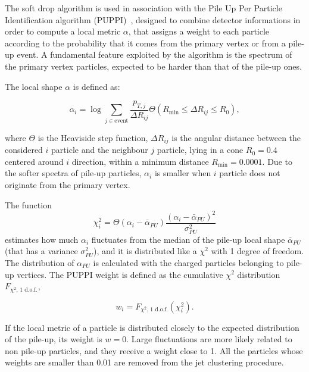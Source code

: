\vspace*{1\baselineskip}

\noindent The soft drop algorithm is used in association with the Pile Up Per Particle Identification algorithm (PUPPI)~\cite{Bertolini2014}, designed to combine detector informations in order to compute a local metric $\alpha$, that %
assigns a weight to each particle according to the probability that it comes from the primary vertex or from a pile-up event. A fundamental feature exploited by the algorithm is the \pt spectrum of the primary vertex particles, expected to be harder than that of the pile-up ones.

\noindent The local shape $\alpha$ is defined as:

\begin{equation}
\alpha_i = \log{ \sum_{j \in \text{event}} \frac{p_{T,j}}{\Delta R_{ij}} \Theta \left( R_{\text{min}} \leq \Delta R_{ij} \leq R_0 \right)},
\label{eq:puppi_shape_def}
\end{equation}

\noindent where $\Theta$ is the Heaviside step function, $\Delta R_{ij}$ is the angular distance between the considered $i$ particle and the neighbour $j$ particle, lying  in a cone $R_0 = 0.4$ centered around $i$ direction, within a minimum distance $R_{\text{min}} = 0.0001$. Due to the softer \pt spectra of pile-up particles, $\alpha_i$ is smaller when $i$ particle does not originate from the primary vertex.

\noindent The function
\begin{equation}
\chi_i^2 = \Theta (\alpha_i - \bar{\alpha}_{PU}) \frac{\left(  \alpha_i -  \bar{\alpha}_{PU}  \right)^2}{\sigma^2_{PU}}
\label{eq:puppi_chi2}
\end{equation}
\noindent estimates how much $\alpha_i$ fluctuates from the median of the pile-up local shape $\bar{\alpha}_{PU}$ (that has a variance $\sigma^2_{PU}$), and it is distributed like a $\chi^2$ with 1 degree of freedom. The distribution of $\alpha_{PU}$ is calculated with the charged particles belonging to pile-up vertices. The PUPPI weight is defined as the cumulative $\chi^2$ distribution $F_{\chi^2\text{, 1 d.o.f.}}$,

\begin{equation}
w_i = F_{\chi^2\text{, 1 d.o.f.}} (\chi_i^2).
\label{eq:puppi_weight}
\end{equation}

\noindent If the local metric of a particle is distributed closely to the expected distribution of the pile-up, its weight is $w=0$. Large fluctuations are more likely related to non pile-up particles, and they receive a weight close to 1.  All the particles whose weights are smaller than 0.01 are removed from the jet clustering procedure.

